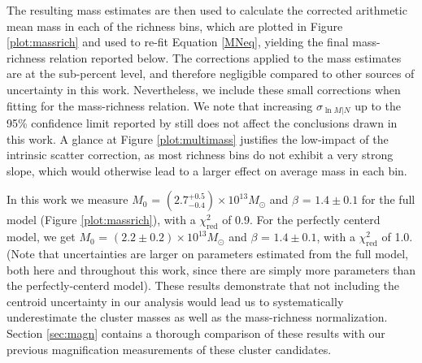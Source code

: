 The resulting mass estimates are then used to calculate the corrected arithmetic mean mass in each of the richness bins, which are plotted in Figure \ref{plot:massrich} and used to re-fit Equation \ref{MNeq}, yielding the final mass-richness relation reported below. The corrections applied to the mass estimates are at the sub-percent level, and therefore negligible compared to other sources of uncertainty in this work. Nevertheless, we include these small corrections when fitting for the mass-richness relation. We note that increasing $\sigma_{\ln M|N}$ up to the 95\% confidence limit reported by \citet{Rozo09a} still does not affect the conclusions drawn in this work. A glance at Figure \ref{plot:multimass} justifies the low-impact of the intrinsic scatter correction, as most richness bins do not exhibit a very strong slope, which would otherwise lead to a larger effect on average mass in each bin.

In this work we measure $M_0$ = $(2.7^{+0.5}_{-0.4}) \times 10^{13} M_{\odot}$ and $\beta$ = $1.4 \pm 0.1$ for the full model (Figure \ref{plot:massrich}), with a $\chi^2_{\mathrm{red}}$ of 0.9. For the perfectly centerd model, we get $M_0$ = $(2.2 \pm 0.2) \times 10^{13} M_{\odot}$ and $\beta$ = $1.4 \pm 0.1$, with a $\chi^2_{\mathrm{red}}$ of 1.0. (Note that uncertainties are larger on parameters estimated from the full model, both here and throughout this work, since there are simply more parameters than the perfectly-centerd model). These results demonstrate that not including the centroid uncertainty in our analysis would lead us to systematically underestimate the cluster masses as well as the mass-richness normalization. Section \ref{sec:magn} contains a thorough comparison of these results with our previous magnification measurements of these cluster candidates.



